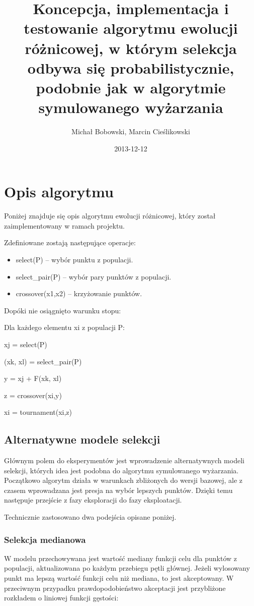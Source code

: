 \documentclass[11pt]{article}
\author{Michał Bobowski, Marcin Cieślikowski}
\date{2013-12-12}
\title{Koncepcja, implementacja i testowanie algorytmu ewolucji różnicowej, w którym selekcja odbywa się probabilistycznie, podobnie jak w algorytmie symulowanego wyżarzania}
\begin{document}
  \maketitle

\section{Opis algorytmu}
Poniżej znajduje się opis algorytmu ewolucji różnicowej, który został zaimplementowany w ramach projektu.

\noindent Zdefiniowane zostają następujące operacje:

\begin{itemize}
 \item select(P) – wybór punktu z populacji.
 \item select\_pair(P) – wybór pary punktów z populacji.
 \item crossover(x1,x2) – krzyżowanie punktów.
\end{itemize}

\noindent Dopóki nie osiągnięto warunku stopu:

\hspace{10pt}Dla każdego elementu xi z populacji P:

\hspace{20pt}xj = select(P)

\hspace{20pt}(xk, xl) = select\_pair(P)

\hspace{20pt}y = xj + F(xk, xl)

\hspace{20pt}z = crossover(xi,y)

\hspace{20pt}xi = tournament(xi,z)

\subsection{Alternatywne modele selekcji}
Głównym polem do eksperymentów jest wprowadzenie alternatywnych modeli selekcji, których idea jest podobna do algorytmu symulowanego wyżarzania.
Początkowo algorytm działa w warunkach zbliżonych do wersji bazowej, ale z czasem wprowadzana jest presja na wybór lepszych punktów.
Dzięki temu następuje przejście z fazy eksploracji do fazy eksploatacji.

\noindent Technicznie zastosowano dwa podejścia opisane poniżej.

\subsubsection{Selekcja medianowa}
W modelu przechowywana jest wartość mediany funkcji celu dla punktów z populacji, aktualizowana po każdym przebiegu pętli głównej.
Jeżeli wylosowany punkt ma lepszą wartość funkcji celu niż mediana, to jest akceptowany.
W przeciwnym przypadku prawdopodobieństwo akceptacji jest przybliżone rozkładem o liniowej funkcji gęstości:
\end{document}
